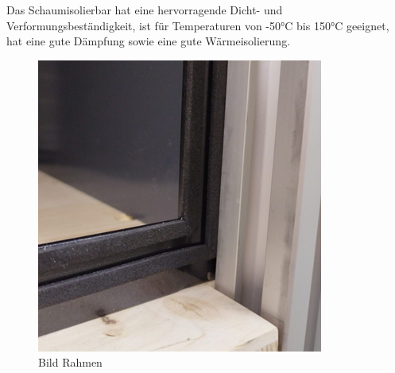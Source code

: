 Das Schaumisolierbar hat eine hervorragende Dicht- und Verformungsbeständigkeit, ist für Temperaturen von -50°C bis 150°C geeignet, hat eine gute Dämpfung sowie eine gute Wärmeisolierung.
\begin{figure}[H]
    \centering
    \includegraphics{image/rahmen2.png}
    \caption{Bild Rahmen}
    \label{fig:enter-label}
\end{figure}
\vspace{5mm}

